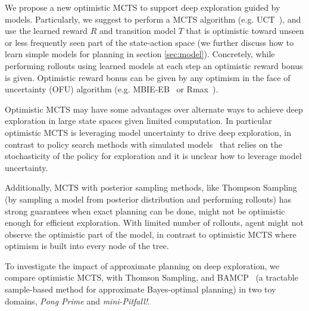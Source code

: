 We propose a new optimistic MCTS to support deep exploration guided by models. Particularly, we suggest to perform a MCTS algorithm (e.g. UCT~\citep{kocsis2006bandit}), and use the learned reward $R$ and transition model $T$ that is optimistic toward unseen or less frequently seen part of the state-action space (we further discuss how to learn simple models for planning in section \ref{sec:model}). 
Concretely, while performing rollouts using learned models at each step an optimistic reward bonus is given. Optimistic reward bonus can be given by any optimism in the face of uncertainty (OFU) algorithm (e.g. MBIE-EB~\citep{strehl2008analysis} or Rmax~\citep{brafman2002r}). %




Optimistic MCTS may have some advantages over alternate ways to achieve deep exploration in large state spaces given limited computation. 
In particular optimistic MCTS is leveraging model uncertainty to drive deep exploration, in contrast to policy search methods with simulated models~\citep{sutton2000policy} that relies on the stochasticity of the policy for exploration and it is unclear how to leverage model uncertainty.

Additionally, MCTS with posterior sampling methods, like Thompson Sampling~\citep{thompson1933likelihood} (by sampling a model from posterior distribution and performing rollouts) has strong guarantees when exact planning can be done, might not be optimistic enough for efficient exploration. With limited number of rollouts, agent might not observe the optimistic part of the model, in contrast to optimistic MCTS where optimism is built into every node of the tree.%



To investigate the impact of approximate planning on deep exploration, we compare optimistic MCTS, with Thomson Sampling, and BAMCP~\citep{guez2012efficient} (a tractable sample-based method for
approximate Bayes-optimal planning) in two toy domains, \textit{Pong Prime} and \textit{mini-Pitfall!}.


